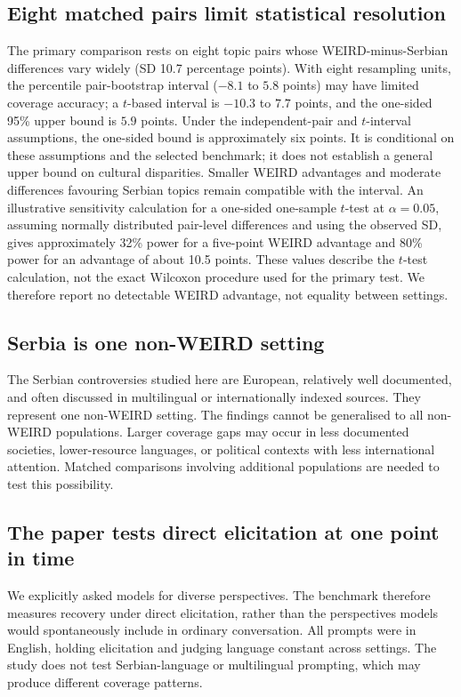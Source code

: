 \documentclass[11pt,a4paper]{article}
\begin{document}
\subsection{Eight matched pairs limit statistical resolution}
\label{sec:Eight matched pairs limit the size of effects we can resolve}
The primary comparison rests on eight topic pairs whose WEIRD-minus-Serbian differences vary widely (SD 10.7 percentage points). With eight resampling units, the percentile pair-bootstrap interval ($-8.1$ to $5.8$ points) may have limited coverage accuracy; a $t$-based interval is $-10.3$ to $7.7$ points, and the one-sided 95\% upper bound is $5.9$ points. Under the independent-pair and $t$-interval assumptions, the one-sided bound is approximately six points. It is conditional on these assumptions and the selected benchmark; it does not establish a general upper bound on cultural disparities. Smaller WEIRD advantages and moderate differences favouring Serbian topics remain compatible with the interval. An illustrative sensitivity calculation for a one-sided one-sample $t$-test at $\alpha=0.05$, assuming normally distributed pair-level differences and using the observed SD, gives approximately 32\% power for a five-point WEIRD advantage and 80\% power for an advantage of about 10.5 points. These values describe the $t$-test calculation, not the exact Wilcoxon procedure used for the primary test. We therefore report no detectable WEIRD advantage, not equality between settings.

\subsection{Serbia is one non-WEIRD setting}
\label{sec:Serbia is one non-WEIRD case}
The Serbian controversies studied here are European, relatively well documented, and often discussed in multilingual or internationally indexed sources. They represent one non-WEIRD setting. The findings cannot be generalised to all non-WEIRD populations. Larger coverage gaps may occur in less documented societies, lower-resource languages, or political contexts with less international attention. Matched comparisons involving additional populations are needed to test this possibility.

\subsection{The paper tests direct elicitation at one point in time}
\label{sec:The paper tests direct elicitation in a single model snapshot}
We explicitly asked models for diverse perspectives. The benchmark therefore measures recovery under direct elicitation, rather than the perspectives models would spontaneously include in ordinary conversation. All prompts were in English, holding elicitation and judging language constant across settings. The study does not test Serbian-language or multilingual prompting, which may produce different coverage patterns.
\end{document}
